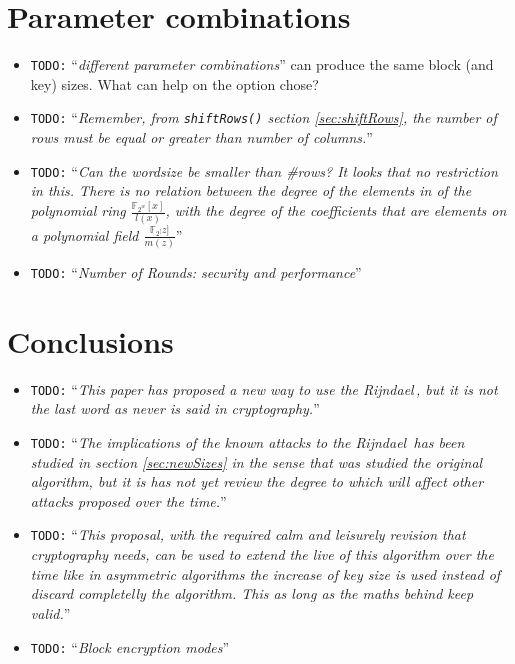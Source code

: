 \documentclass[10pt,a4paper,twoside]{llncs}
\newcommand{\todo}[1]{\texttt{\color{red}TODO:} ``\emph{#1}''}
\newcommand{\rijndael}{\emph{Rijndael}}
\newcommand{\Fpn}[2]{\ensuremath{\mathbb{F}_{#1^#2}}}
\begin{document}
\section{Parameter combinations}\label{sec:parameterCombinations}
\begin{itemize}
 \item \todo{different parameter combinations} can produce the same block (and key) sizes. What can help on the option chose?
 \item \todo{Remember, from {\tt shiftRows()} section \ref{sec:shiftRows}, the number of rows must be equal or greater than number of columns.}
 \item \todo{Can the wordsize be smaller than \#rows? It looks that no restriction in this. There is no relation between the degree of the elements in of the polynomial ring $\frac{\Fpn{2}{w}[x]}{l(x)}$, with the degree of the coefficients that are elements on a polynomial field $\frac{\Fpn{2}[z]}{m(z)}$}
 \item \todo{Number of Rounds: security and performance}
\end{itemize}

\section{Conclusions}\label{sec:conclusion}
\begin{itemize}
    \item \todo{This paper has proposed a new way to use the \rijndael\,, but it is not the last word as never is said in cryptography.}
    \item \todo{The implications of the known attacks to the \rijndael\, has been studied in section \ref{sec:newSizes} in the sense that was studied the original algorithm, but it is has not yet review the degree to which will affect other attacks proposed over the time.}
    \item \todo{This proposal, with the required calm and leisurely revision that cryptography needs, can be used to extend the live of this algorithm over the time like in asymmetric algorithms the increase of key size is used instead of discard completelly the algorithm. This as long as the maths behind keep valid.}
    \item \todo{Block encryption modes}
\end{itemize}
\end{document}
